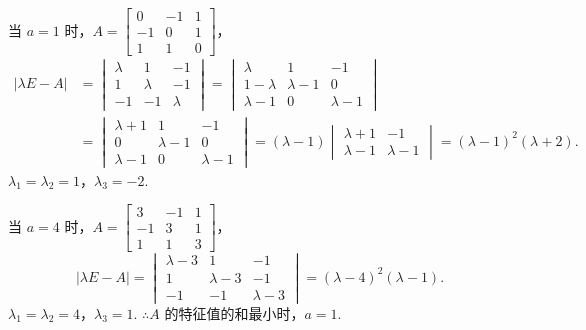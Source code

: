 \documentclass[a4paper,11pt]{ctexart}
\begin{document}
当 $a = 1$ 时，$A = \begin{bmatrix} 0 & -1 & 1 \\ -1 & 0 & 1 \\ 1 & 1 & 0 \end{bmatrix}$，
\begin{align*}
  |\lambda E - A| &= \begin{vmatrix}
    \lambda & 1 & -1 \\
    1 & \lambda & -1 \\
    -1 & -1 & \lambda
  \end{vmatrix}
  = \begin{vmatrix}
    \lambda & 1 & -1 \\
    1 - \lambda & \lambda - 1 & 0 \\
    \lambda - 1 & 0 & \lambda - 1
  \end{vmatrix} \\
  &= \begin{vmatrix}
    \lambda + 1 & 1 & -1 \\
    0 & \lambda - 1 & 0 \\
    \lambda - 1 & 0 & \lambda - 1
  \end{vmatrix}
  = (\lambda - 1) \begin{vmatrix} \lambda + 1 & -1 \\ \lambda - 1 & \lambda - 1 \end{vmatrix}
  = (\lambda - 1)^2 (\lambda + 2).
\end{align*}
$\lambda_1 = \lambda_2 = 1$，$\lambda_3 = -2$.

当 $a = 4$ 时，$A = \begin{bmatrix} 3 & -1 & 1 \\ -1 & 3 & 1 \\ 1 & 1 & 3 \end{bmatrix}$，
\[
  |\lambda E - A| = \begin{vmatrix}
    \lambda - 3 & 1 & -1 \\
    1 & \lambda - 3 & -1 \\
    -1 & -1 & \lambda - 3
  \end{vmatrix} = (\lambda - 4)^2 (\lambda - 1).
\]
$\lambda_1 = \lambda_2 = 4$，$\lambda_3 = 1$. $\therefore A$ 的特征值的和最小时，$a = 1$.
\end{document}

